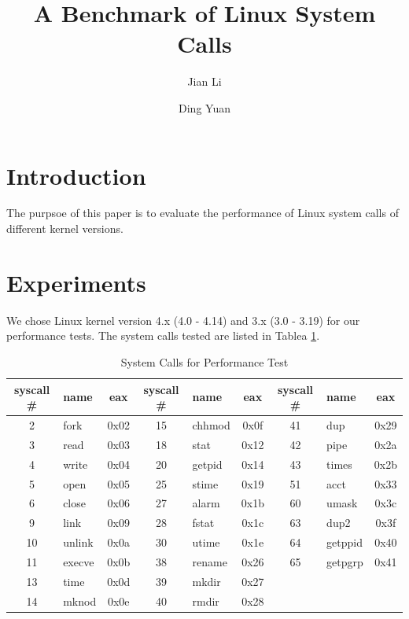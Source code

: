 \documentclass{article}
\begin{document}
\title{A Benchmark of Linux System Calls}
\author{Jian Li \and Ding Yuan}
\maketitle

\section{Introduction}

The purpsoe of this paper is to evaluate the performance of Linux system calls of different kernel versions.


\section{Experiments}

We chose Linux kernel version 4.x (4.0 - 4.14) and 3.x (3.0 - 3.19) for our performance tests. The system calls tested are listed in Tablea \ref{tab:syscalls}.

\begin{table}
    \centering
    \begin{tabular}{clcclcclc}
        \toprule
        syscall \# & name & eax & syscall \# & name & eax & syscall \# & name & eax \\
        \midrule
        2 & fork & 0x02     &  15 & chhmod & 0x0f   &  41 & dup & 0x29 \\
        3 & read & 0x03     &  18 & stat & 0x12     &  42 & pipe & 0x2a \\
        4 & write & 0x04    &  20 & getpid & 0x14   &  43 & times & 0x2b \\
        5 & open & 0x05     &  25 & stime & 0x19    &  51 & acct & 0x33 \\
        6 & close & 0x06    &  27 & alarm & 0x1b    &  60 & umask & 0x3c \\
        9 & link & 0x09     &  28 & fstat & 0x1c    &  63 & dup2 & 0x3f \\
        10 & unlink & 0x0a  &  30 & utime & 0x1e    &  64 & getppid & 0x40 \\
        11 & execve & 0x0b  &  38 & rename & 0x26   &  65 & getpgrp & 0x41 \\
        13 & time & 0x0d    &  39 & mkdir & 0x27    & \\
        14 & mknod & 0x0e   &  40 & rmdir & 0x28    & \\
        \bottomrule
    \end{tabular}
    \caption{\label{tab:syscalls} System Calls for Performance Test}
\end{table}
\end{document}
